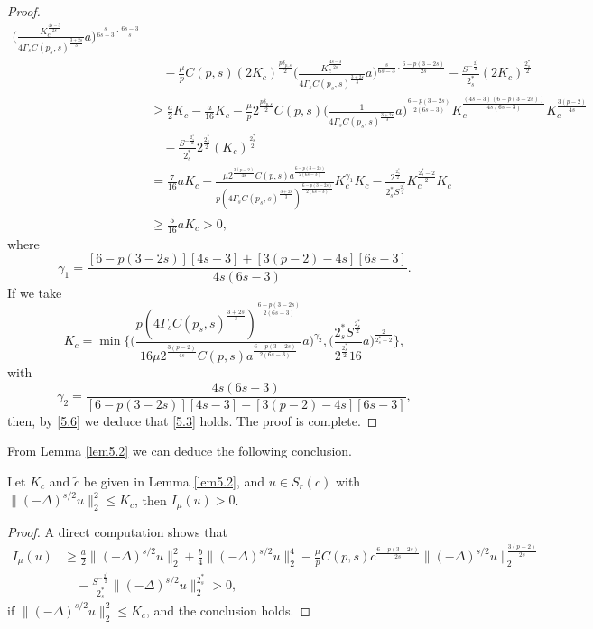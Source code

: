 \begin{proof}
\begin{equation}
\begin{split}
  \Big(\frac{K_c^{\frac{4s-3}{2s}}}{4\Gamma_s C(p_s, s)^{\frac{3+2s}{3}}}a
   \Big)^{{\frac{s}{6s-3}}\cdot\frac{6s-3}{s}}\\
&\quad -\frac{\mu}{p}C(p,s)(2K_c)^{\frac{p {\delta_{p,s}}}{2}} 
 \Big(\frac{K_c^{\frac{4s-3}{2s}}}{4\Gamma_s C(p_s, s)^{\frac{3+2s}{3}}}a
 \Big)^{\frac{s}{6s-3}\cdot{\frac{6-p(3-2s)}{2s}}}
 -\frac{S^{-\frac{2^*_s}{2}}}{2^*_s}(2K_c)^{\frac{2^*_s}{2}}\\
&\geq  \frac{a}{2}K_c-\frac{a}{16}K_c-\frac{\mu}{p}2^{\frac{p {\delta_{p,s}}}{2}}
 C(p,s)\Big(\frac{1}{4\Gamma_s C(p_s, s)^{\frac{3+2s}{3}}}a
 \Big)^{{\frac{6-p(3-2s)}{2(6s-3)}}}K^{\frac{(4s-3)(6-p(3-2s))}{4s(6s-3)}}_c 
  K^{\frac{3(p-2)}{4s}}_c\\
&\quad -\frac{S^{-\frac{2^*_s}{2}}}{2^*_s}2^{\frac{2^*_s}{2}}(K_c)^{\frac{2^*_s}{2}}\\
&= \frac{7}{16}aK_c-\frac{\mu 2^{\frac{3(p-2)}{4s}}C(p,s)a^{{\frac{6-p(3-2s)}{2(6s-3)}}}}{p(4\Gamma_s C(p_s, s)^{\frac{3+2s}{3}})^{\frac{6-p(3-2s)}{2(6s-3)}}}K^{\gamma_1}_c K_c-\frac{2^{\frac{2^*_s}{2}}}{2^*_sS^{\frac{2^*_s}{2}}}K^{\frac{2^*_s-2}{2}}_c K_c\\
&\geq   \frac{5}{16}aK_c>0,
\end{split}
\end{equation}
where 
\[
\gamma_1=\frac{[6-p(3-2s)][4s-3]+[3(p-2)-4s][6s-3]}{4s(6s-3)}.
\] 
If we take
$$
K_c=\min\Big\{ \Big(\frac{{p(4\Gamma_s C(p_s, s)^{\frac{3+2s}{3}}) }
 ^{\frac{6-p(3-2s)}{2(6s-3)}}}{16 \mu 2^{\frac{3(p-2)}{4s}}C(p,s)
 a^\frac{6-p(3-2s)}{2(6s-3)}} a\Big)^{\gamma_2}, 
 \Big(\frac{2^*_s S^{\frac{2^*_s}{2}}}{2^{\frac{2^*_s}{2}}16} a
  \Big)^{\frac{2}{2^*_s-2}}\Big\},
$$
with 
\[
\gamma_2=\frac{4s(6s-3)}{[6-p(3-2s)][4s-3]+[3(p-2)-4s][6s-3]},
\]
then, by \eqref{5.6} we deduce that \eqref{5.3} holds. The proof is complete.
\end{proof}

From Lemma \ref{lem5.2}  we can deduce the following conclusion.

\begin{corollary}\label{cor5.1}  
Let $K_c$ and $\tilde{c}$ be given in Lemma \ref{lem5.2}, and $u\in  S_{r}(c)$ with 
$\|(-\Delta)^{s/2}u\|^2_2 \leq K_c$, then $I_\mu(u)>0$.
\end{corollary}

\begin{proof}
A direct computation shows that
\begin{align*} %
I_\mu(u)
&\geq  \frac{a}{2}\|(-\Delta)^{s/2}u\|^2_2+\frac{b}{4}\|(-\Delta)^{s/2}u\|^4_2
 -\frac{\mu}{p}C(p,s)
c^{\frac{6-p(3-2s)}{2s}}\|(-\Delta)^{s/2}u\|^{\frac{3(p-2)}{2s}}_2\\
&\quad -\frac{S^{-\frac{2^*_s}{2}}}{2^*_s}\|(-\Delta)^{s/2}u\|^{2^*_s}_2>0,
\end{align*}
if $\|(-\Delta)^{s/2}u\|^2_2 \leq K_c$, and the conclusion holds.
\end{proof}

